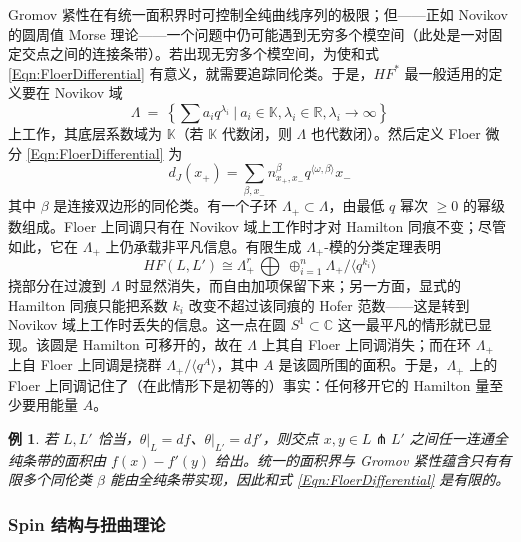 \documentclass[11pt,a4paper]{article}
\numberwithin{equation}{section}
\newtheorem{Example}[thm]{例}
\newcommand{\bR}{\mathbb{R}}
\newcommand{\bC}{\mathbb{C}}
\newcommand{\bK}{\mathbb{K}}
\begin{document}
Gromov 紧性在有统一面积界时可控制全纯曲线序列的极限；但——正如 Novikov 的圆周值 Morse 理论——一个问题中仍可能遇到无穷多个模空间（此处是一对固定交点之间的连接条带）。若出现无穷多个模空间，为使和式 \eqref{Eqn:FloerDifferential} 有意义，就需要追踪同伦类。于是，$HF^*$ 最一般适用的定义要在 Novikov 域
\begin{equation} \label{Eqn:NovikovField}
\Lambda \ = \ \left\{ \sum a_i q^{\lambda_i} \ | \ a_i \in \bK, \lambda_i \in \bR, \lambda_i \rightarrow \infty \right\}
\end{equation}
上工作，其底层系数域为 $\bK$（若 $\bK$ 代数闭，则 $\Lambda$ 也代数闭）。然后定义 Floer 微分 \eqref{Eqn:FloerDifferential} 为
\begin{equation} \label{Eqn:FloerDifferential-Novikov}
d_J(x_+) = \sum_{\beta, x_-} n^{\beta}_{x_+, x_-} q^{\langle \omega, \beta\rangle} x_-
\end{equation}
其中 $\beta$ 是连接双边形的同伦类。有一个子环 $\Lambda_+ \subset \Lambda$，由最低 $q$ 幂次 $\geq 0$ 的幂级数组成。Floer 上同调只有在 Novikov 域上工作时才对 Hamilton 同痕不变；尽管如此，它在 $\Lambda_+$ 上仍承载非平凡信息。有限生成 $\Lambda_+$-模的分类定理表明
\[
HF(L,L') \cong \Lambda_+^r \, \bigoplus \ \oplus_{i=1}^n \Lambda_+ / \langle q^{k_i} \rangle
\]
挠部分在过渡到 $\Lambda$ 时显然消失，而自由加项保留下来；另一方面，显式的 Hamilton 同痕只能把系数 $k_i$ 改变不超过该同痕的 Hofer 范数——这是转到 Novikov 域上工作时丢失的信息。这一点在圆 $S^1 \subset \bC$ 这一最平凡的情形就已显现。该圆是 Hamilton 可移开的，故在 $\Lambda$ 上其自 Floer 上同调消失；而在环 $\Lambda_+$ 上自 Floer 上同调是挠群 $\Lambda_+ / \langle q^A \rangle$，其中 $A$ 是该圆所围的面积。于是，$\Lambda_+$ 上的 Floer 上同调记住了（在此情形下是初等的）事实：任何移开它的 Hamilton 量至少要用能量 $A$。

\begin{Example}
若 $L, L'$ 恰当，$\theta|_L = df$、$\theta|_{L'} = df'$，则交点 $x,y \in L\pitchfork L'$ 之间任一连通全纯条带的面积由 $f(x)-f'(y)$ 给出。统一的面积界与 Gromov 紧性蕴含只有有限多个同伦类 $\beta$ 能由全纯条带实现，因此和式 \eqref{Eqn:FloerDifferential} 是有限的。
\end{Example}

\subsubsection{Spin 结构与扭曲理论}
\end{document}
